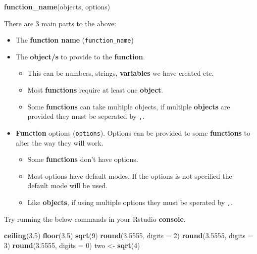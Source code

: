 \documentclass[]{book}
\newenvironment{Shaded}{\begin{snugshade}}{\end{snugshade}}
\newcommand{\KeywordTok}[1]{\textcolor[rgb]{0.13,0.29,0.53}{\textbf{#1}}}
\newcommand{\DataTypeTok}[1]{\textcolor[rgb]{0.13,0.29,0.53}{#1}}
\newcommand{\DecValTok}[1]{\textcolor[rgb]{0.00,0.00,0.81}{#1}}
\newcommand{\FloatTok}[1]{\textcolor[rgb]{0.00,0.00,0.81}{#1}}
\newcommand{\StringTok}[1]{\textcolor[rgb]{0.31,0.60,0.02}{#1}}
\newcommand{\NormalTok}[1]{#1}
\providecommand{\tightlist}{%
  \setlength{\itemsep}{0pt}\setlength{\parskip}{0pt}}
\begin{document}
\begin{Shaded}
\begin{Highlighting}[]
\KeywordTok{function_name}\NormalTok{(objects, options)}
\end{Highlighting}
\end{Shaded}

There are 3 main parts to the above:

\begin{itemize}
\tightlist
\item
  The \textbf{function name} (\texttt{function\_name})
\item
  The \textbf{object/s} to provide to the \textbf{function}.

  \begin{itemize}
  \tightlist
  \item
    This can be numbers, strings, \textbf{variables} we have created
    etc.
  \item
    Most \textbf{functions} require at least one \textbf{object}.
  \item
    Some \textbf{functions} can take multiple objects, if multiple
    \textbf{objects} are provided they must be seperated by \texttt{,}.
  \end{itemize}
\item
  \textbf{Function} options (\texttt{options}). Options can be provided
  to some \textbf{functions} to alter the way they will work.

  \begin{itemize}
  \tightlist
  \item
    Some \textbf{functions} don't have options.
  \item
    Most options have default modes. If the options is not specified the
    default mode will be used.
  \item
    Like \textbf{objects}, if using multiple options they must be
    sperated by \texttt{,}.
  \end{itemize}
\end{itemize}

Try running the below commands in your Rstudio \textbf{console}.

\begin{Shaded}
\begin{Highlighting}[]
\KeywordTok{ceiling}\NormalTok{(}\FloatTok{3.5}\NormalTok{)}
\KeywordTok{floor}\NormalTok{(}\FloatTok{3.5}\NormalTok{)}
\KeywordTok{sqrt}\NormalTok{(}\DecValTok{9}\NormalTok{)}
\KeywordTok{round}\NormalTok{(}\FloatTok{3.5555}\NormalTok{, }\DataTypeTok{digits =} \DecValTok{2}\NormalTok{)}
\KeywordTok{round}\NormalTok{(}\FloatTok{3.5555}\NormalTok{, }\DataTypeTok{digits =} \DecValTok{3}\NormalTok{)}
\KeywordTok{round}\NormalTok{(}\FloatTok{3.5555}\NormalTok{, }\DataTypeTok{digits =} \DecValTok{0}\NormalTok{)}
\NormalTok{two <-}\StringTok{ }\KeywordTok{sqrt}\NormalTok{(}\DecValTok{4}\NormalTok{)}
\end{Highlighting}
\end{Shaded}
\end{document}
